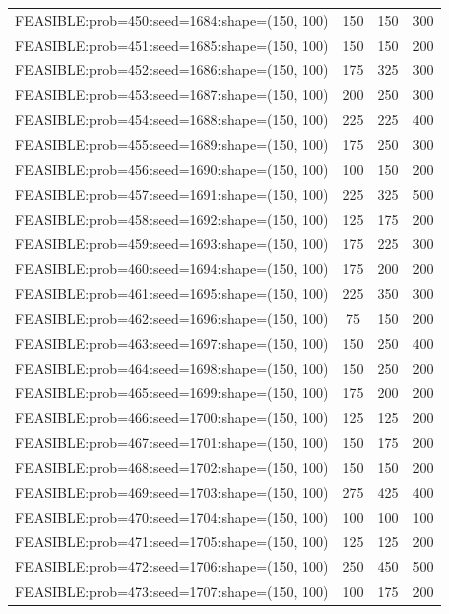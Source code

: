 \begin{longtable}{lccc}
FEASIBLE:prob=450:seed=1684:shape=(150, 100) &  150 &   150 &    300 \\
FEASIBLE:prob=451:seed=1685:shape=(150, 100) &  150 &   150 &    200 \\
FEASIBLE:prob=452:seed=1686:shape=(150, 100) &  175 &   325 &    300 \\
FEASIBLE:prob=453:seed=1687:shape=(150, 100) &  200 &   250 &    300 \\
FEASIBLE:prob=454:seed=1688:shape=(150, 100) &  225 &   225 &    400 \\
FEASIBLE:prob=455:seed=1689:shape=(150, 100) &  175 &   250 &    300 \\
FEASIBLE:prob=456:seed=1690:shape=(150, 100) &  100 &   150 &    200 \\
FEASIBLE:prob=457:seed=1691:shape=(150, 100) &  225 &   325 &    500 \\
FEASIBLE:prob=458:seed=1692:shape=(150, 100) &  125 &   175 &    200 \\
FEASIBLE:prob=459:seed=1693:shape=(150, 100) &  175 &   225 &    300 \\
FEASIBLE:prob=460:seed=1694:shape=(150, 100) &  175 &   200 &    200 \\
FEASIBLE:prob=461:seed=1695:shape=(150, 100) &  225 &   350 &    300 \\
FEASIBLE:prob=462:seed=1696:shape=(150, 100) &   75 &   150 &    200 \\
FEASIBLE:prob=463:seed=1697:shape=(150, 100) &  150 &   250 &    400 \\
FEASIBLE:prob=464:seed=1698:shape=(150, 100) &  150 &   250 &    200 \\
FEASIBLE:prob=465:seed=1699:shape=(150, 100) &  175 &   200 &    200 \\
FEASIBLE:prob=466:seed=1700:shape=(150, 100) &  125 &   125 &    200 \\
FEASIBLE:prob=467:seed=1701:shape=(150, 100) &  150 &   175 &    200 \\
FEASIBLE:prob=468:seed=1702:shape=(150, 100) &  150 &   150 &    200 \\
FEASIBLE:prob=469:seed=1703:shape=(150, 100) &  275 &   425 &    400 \\
FEASIBLE:prob=470:seed=1704:shape=(150, 100) &  100 &   100 &    100 \\
FEASIBLE:prob=471:seed=1705:shape=(150, 100) &  125 &   125 &    200 \\
FEASIBLE:prob=472:seed=1706:shape=(150, 100) &  250 &   450 &    500 \\
FEASIBLE:prob=473:seed=1707:shape=(150, 100) &  100 &   175 &    200 \\

\end{longtable}
